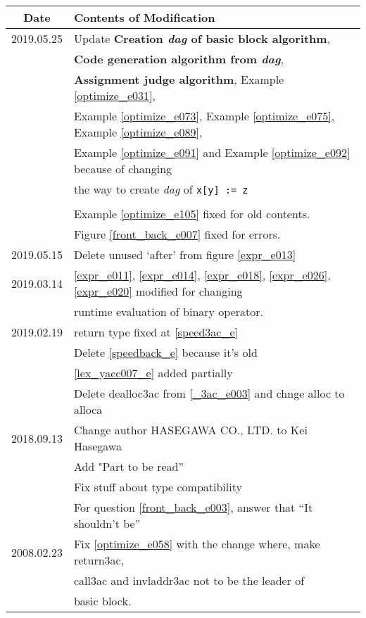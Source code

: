 \begin{tabular}{|c|l|} \hline
  Date &  Contents of Modification \\ \hline
  2019.05.25 & Update {\bf Creation {\em dag} of basic block algorithm}, \\
  & {\bf Code generation algorithm from {\em dag}}, \\
  & {\bf Assignment judge algorithm}, Example \ref{optimize_e031},
      \\
      & Example \ref{optimize_e073},
      Example \ref{optimize_e075}, Example \ref{optimize_e089},
       \\
       & Example \ref{optimize_e091} and
       Example \ref{optimize_e092} because of changing \\
  &  the way to create {\em dag} of {\tt{x[y] := z}} \\
             &  \\
             & Example \ref{optimize_e105} fixed for old contents. \\
             & Figure \ref{front_back_e007} fixed for errors. \\ \hline
  2019.05.15 & Delete unused `after' from figure \ref{expr_e013} \\ \hline
  2019.03.14 & \ref{expr_e011}, \ref{expr_e014}, \ref{expr_e018}, \ref{expr_e026}, \ref{expr_e020} modified for changing \\
  & runtime evaluation of binary operator. \\ \hline
2019.02.19 & return type fixed at \ref{speed3ac_e} \\
           & Delete \ref{speedback_e} because it's old \\
& \ref{lex_yacc007_e} added partially \\
 & Delete dealloc3ac from \ref{_3ac_e003} and chnge alloc to alloca \\ \hline
2018.09.13 & Change author HASEGAWA CO., LTD. to Kei Hasegawa \\
           & Add "Part to be read'' \\
& Fix stuff about type compatibility \\
& For question \ref{front_back_e003}, answer that ``It shouldn't be'' \\
\hline
2008.02.23 & Fix \ref{optimize_e058} with the change where, make
           return3ac, \\
           & call3ac  and invladdr3ac not to be the leader of \\
           & basic block. \\ \hline

\end{tabular}
